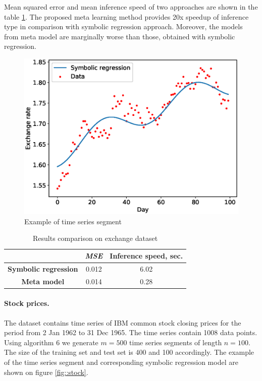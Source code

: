 \documentclass[12pt]{article}
\let\originalparagraph\paragraph
\renewcommand{\paragraph}[2][.]{\originalparagraph{#2#1}}
\begin{document}
Mean squared error and mean inference speed of two approaches are shown in the table \ref{table-exchange}.
The proposed meta learning method provides 20x speedup of inference type in comparison with symbolic regression approach. Moreover, the models from meta model are marginally worse than those, obtained with symbolic regression.
\begin{figure}[!ht]
\centering
\includegraphics[scale=0.7]{exchange.eps}
\caption{Example of time series segment}
\label{fig::exchange}
\end{figure}

\begin{table}[!h]
\centering
\caption{Results comparison on exchange dataset}
\label{table-exchange}
\begin{tabular}{c|c|c|}
\cline{2-3}
                                                   & \textit{MSE} & Inference speed, sec. \\ \hline
\multicolumn{1}{|c|}{\textbf{Symbolic regression}} & 0.012        & 6.02                  \\ \hline
\multicolumn{1}{|c|}{\textbf{Meta model}}          & 0.014        & 0.28                  \\ \hline
\end{tabular}
\end{table}

\paragraph{Stock prices}
The dataset \cite{stock} contains time series of IBM common stock closing prices for the period from 2 Jan 1962 to 31 Dec 1965.
The time series contain 1008 data points.
Using algorithm 6 we generate $m=500$ time series segments of length $n=100$. The size of the training set and test set is 400 and 100 accordingly.
The example of the time series segment and corresponding symbolic regression model are shown on figure \ref{fig::stock}.
\end{document}
